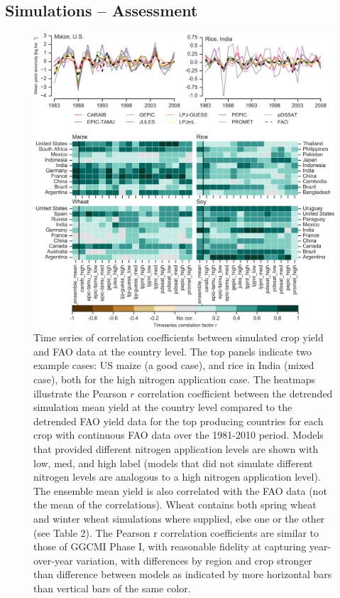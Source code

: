 \documentclass[gmd, manuscript]{copernicus} %
\begin{document}

\appendix
\section{}
\subsection{Simulations -- Assessment}
\label{A:1}

\begin{figure}[t]
    \centering
    \includegraphics[width=15cm]{figures/Agformet_validation.png}
    \caption{Time series of correlation coefficients between simulated crop yield and FAO data \citep{FAOSTAT} at the country level. The top panels indicate two example cases: US maize (a good case), and rice in India (mixed case), both for the high nitrogen application case. The heatmaps illustrate the Pearson $r$ correlation coefficient between the detrended simulation mean yield at the country level compared to the detrended FAO yield data for the top producing countries for each crop with continuous FAO data over the 1981-2010 period. Models that provided different nitrogen application levels are shown with low, med, and high label (models that did not simulate different nitrogen levels are analogous to a high nitrogen application level). The ensemble mean yield is also correlated with the FAO data (not the mean of the correlations). Wheat contains both spring wheat and winter wheat simulations where supplied, else one or the other (see Table 2). The Pearson r correlation coefficients are similar to those of GGCMI Phase I, with reasonable fidelity at capturing year-over-year variation, with differences by region and crop stronger than difference between models as indicated by more horizontal bars than vertical bars of the same color.}

\end{figure}
\end{document}
